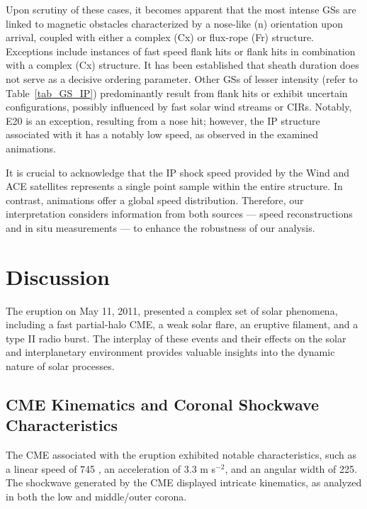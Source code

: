 Upon scrutiny of these cases, it becomes apparent that the most intense GSs are linked to magnetic obstacles characterized by a nose-like (n) orientation upon arrival, coupled with either a complex (Cx) or flux-rope (Fr) structure. Exceptions include instances of fast speed flank hits or flank hits in combination with a complex (Cx) structure. It has been established that sheath duration does not serve as a decisive ordering parameter. Other GSs of lesser intensity (refer to Table~\ref{tab_GS_IP}) predominantly result from flank hits or exhibit uncertain configurations, possibly influenced by fast solar wind streams or CIRs. Notably, E20 is an exception, resulting from a nose hit; however, the IP structure associated with it has a notably low speed, as observed in the examined animations.

It is crucial to acknowledge that the IP shock speed provided by the Wind and ACE satellites represents a single point sample within the entire structure. In contrast, animations offer a global speed distribution. Therefore, our interpretation considers information from both sources — speed reconstructions and in situ measurements — to enhance the robustness of our analysis.













\section{Discussion}
The eruption on May 11, 2011, presented a complex set of solar phenomena, including a fast partial-halo CME, a weak solar flare, an eruptive filament, and a type II radio burst. The interplay of these events and their effects on the solar and interplanetary environment provides valuable insights into the dynamic nature of solar processes.

\subsection{CME Kinematics and Coronal Shockwave Characteristics}
The CME associated with the eruption exhibited notable characteristics, such as a linear speed of 745 \kms, an acceleration of 3.3 m s$^{-2}$, and an angular width of 225\degree. The shockwave generated by the CME displayed intricate kinematics, as analyzed in both the low and middle/outer corona.

